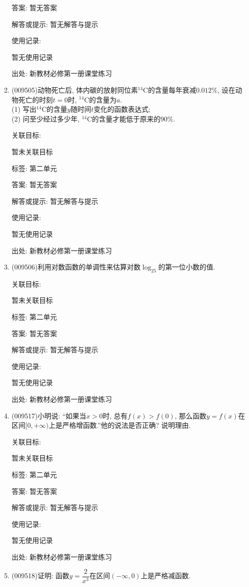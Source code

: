 \documentclass[10pt,a4paper]{article}
\begin{document}
\begin{enumerate}[1.]
答案: 暂无答案

解答或提示: 暂无解答与提示

使用记录:

暂无使用记录


出处: 新教材必修第一册课堂练习
\item { (009505)}动物死亡后, 体内碳的放射同位素$^{14}\text{C}$的含量每年衰减$0.012\%$, 设在动物死亡的时刻$t=0$时, $^{14}\text{C}$的含量为$a$.\\
(1) 写出$^{14}\text{C}$的含量$y$随时间$t$变化的函数表达式;\\
(2) 问至少经过多少年, $^{14}\text{C}$的含量才能低于原来的$90\%$.


关联目标:

暂未关联目标



标签: 第二单元

答案: 暂无答案

解答或提示: 暂无解答与提示

使用记录:

暂无使用记录


出处: 新教材必修第一册课堂练习
\item { (009506)}利用对数函数的单调性来估算对数$\log_25$的第一位小数的值.


关联目标:

暂未关联目标



标签: 第二单元

答案: 暂无答案

解答或提示: 暂无解答与提示

使用记录:

暂无使用记录


出处: 新教材必修第一册课堂练习
\item { (009517)}小明说: ``如果当$x>0$时, 总有$f(x)>f(0)$, 那么函数$y=f(x)$在区间$[0, +\infty)$上是严格增函数.''他的说法是否正确? 说明理由.


关联目标:

暂未关联目标



标签: 第二单元

答案: 暂无答案

解答或提示: 暂无解答与提示

使用记录:

暂无使用记录


出处: 新教材必修第一册课堂练习
\item { (009518)}证明: 函数$y=\dfrac2{x^3}$在区间$(-\infty, 0)$上是严格减函数.



\end{enumerate}
\end{document}
